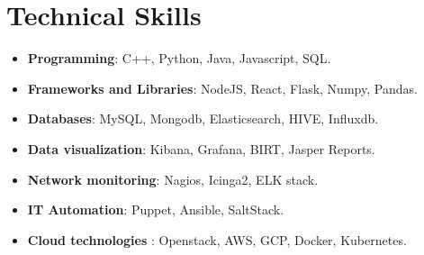 \documentclass[letterpaper,11pt]{article}
\newcommand{\resumeItem}[2]{
	\item\small{
		\textbf{#1}{: #2 \vspace{-2pt}}
	}
}
\newcommand{\resumeSubItem}[2]{\resumeItem{#1}{#2}\vspace{-4pt}}
\newcommand{\resumeSubHeadingListStart}{\begin{itemize}[leftmargin=*]}
\newcommand{\resumeSubHeadingListEnd}{\end{itemize}}
\begin{document}
	
	
	
	
	
	
		
		\section{Technical Skills}
		\resumeSubHeadingListStart
		\itemsep0em 
		\item{
			\textbf{Programming}{: C++, Python, Java, Javascript, SQL.}
		}
		\item{
			\textbf{Frameworks and Libraries}{: NodeJS, React, Flask, Numpy, Pandas.}
		}
		\item{
			\textbf{Databases}{: MySQL, Mongodb, Elasticsearch, HIVE, Influxdb.}
		}
		\item{
			\textbf{Data visualization}{: Kibana, Grafana, BIRT, Jasper Reports.}
		}
		\item{
			\textbf{Network monitoring}{: Nagios, Icinga2, ELK stack.}
		}
		\item {
			\textbf{IT Automation}{: Puppet, Ansible, SaltStack.}
		}

		\item{
			\textbf{Cloud technologies} {: Openstack, AWS, GCP, Docker, Kubernetes.}
		}
		\resumeSubHeadingListEnd
	
	
\end{document}
